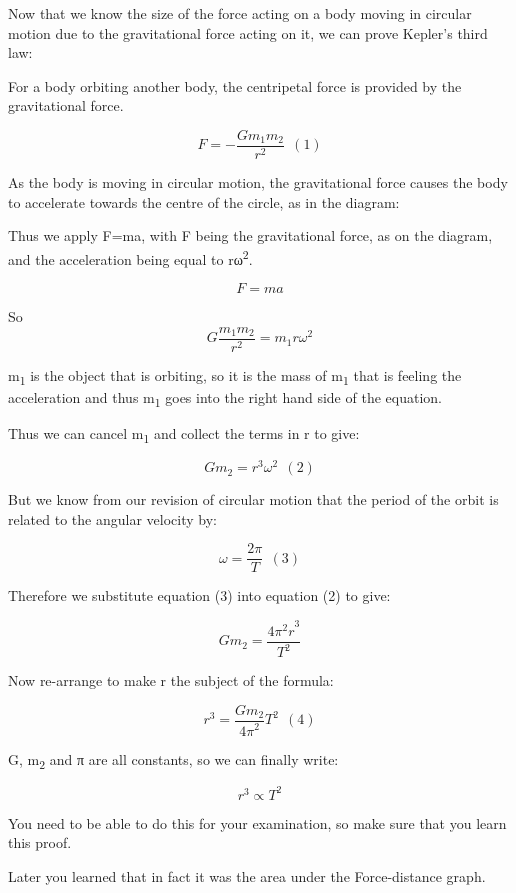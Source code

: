 \documentclass[main.tex]{subfiles}
\begin{document}

Now that we know the size of the force acting on a body moving in
circular motion due to the gravitational force acting on it, we can
prove Kepler's third law:

For a body orbiting another body, the centripetal force is provided by
the gravitational force.

\[F = - \frac{Gm_{1}m_{2}}{r^{2}}\ \ (1)\]

As the body is moving in circular motion, the gravitational force causes
the body to accelerate towards the centre of the circle, as in the
diagram:

Thus we apply F=ma, with F being the gravitational force, as on the
diagram, and the acceleration being equal to rω\textsuperscript{2}.

\[F = ma\]

So \[G\frac{m_{1}m_{2}}{r^{2}} = m_{1}r\omega^{2}\]

m\textsubscript{1} is the object that is orbiting, so it is the mass of
m\textsubscript{1} that is feeling the acceleration and thus
m\textsubscript{1} goes into the right hand side of the equation.

Thus we can cancel m\textsubscript{1} and collect the terms in r to
give:

\[Gm_{2} = r^{3}\omega^{2}\ \ (2)\]

But we know from our revision of circular motion that the period of the
orbit is related to the angular velocity by:

\[\omega = \frac{2\pi}{T}\ \ (3)\]

Therefore we substitute equation (3) into equation (2) to give:

\[Gm_{2} = \frac{{4\pi^{2}r}^{3}}{T^{2}}\]

Now re-arrange to make r the subject of the formula:

\[r^{3} = \frac{Gm_{2}}{{4\pi}^{2}}T^{2}\ \ (4)\]

G, m\textsubscript{2} and π are all constants, so we can finally write:

\[r^{3} \propto T^{2}\]

You need to be able to do this for your examination, so make sure that
you learn this proof.


Later you learned that in fact it was the area under the Force-distance
graph.
\end{document}
